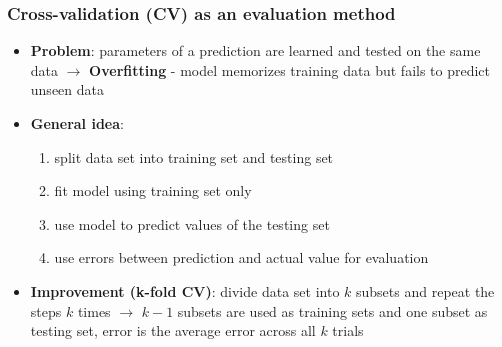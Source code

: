 \documentclass{beamer}
\begin{document}
\begin{frame}
	\frametitle{Cross-validation (CV) as an evaluation method}

	\vspace*{0.5cm}
	\begin{itemize}
		\item \textbf{Problem}: parameters of a prediction are learned and tested on the same data $\rightarrow$ \textbf{Overfitting} - model memorizes training data but fails to predict unseen data
		\vspace{0.2cm}
		\item \textbf{General idea}: 
		\begin{enumerate}
			\item split data set into training set and testing set
			\vspace{0.2cm}
			\item fit model using training set only
			\vspace{0.2cm}
			\item use model to predict values of the testing set
			\vspace{0.2cm}
			\item use errors between prediction and actual value for evaluation 
		\end{enumerate}
		\item \textbf{Improvement (k-fold CV)}: divide data set into $k$ subsets and repeat the steps $k$ times $\rightarrow$ $k-1$ subsets are used as training sets and one subset as testing set, error is the average error across all $k$ trials 
		
	\end{itemize}
\end{frame}
\end{document}
